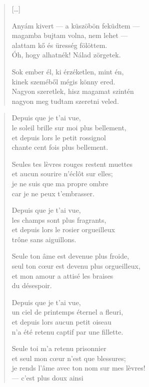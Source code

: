 \documentclass[11pt]{book}
\newcommand*{\centeredornament}{\centerline{\pgfornament[width=6cm]{88}}}
\begin{document}
\newpage

\vspace*{-15mm}
\centeredornament


\poemtitle*{\phantom{Gyermekké tettél}}

\begin{verse}
  \textnormal{[\ldots]}

  Anyám kivert --- a küszöbön feküdtem --- \\
  magamba bujtam volna, nem lehet --- \\
  alattam kő és üresség fölöttem. \\
  Óh, hogy alhatnék! Nálad zörgetek.

  Sok ember él, ki érzéketlen, mint én, \\
  kinek szeméből mégis könny ered. \\
  Nagyon szeretlek, hisz magamat szintén \\
  nagyon meg tudtam szeretni veled.
\end{verse}

\newpage

\vspace*{-15mm}
\centeredornament



\begin{verse}
  Depuis que je t'ai vue, \\
  le soleil brille sur moi plus bellement, \\
  et depuis lors le petit rossignol \\
  chante cent fois plus bellement.

  Seules tes lèvres rouges restent muettes \\
  et aucun sourire n'éclôt sur elles; \\
  je ne suis que ma propre ombre \\
  car je ne peux t'embrasser.

  Depuis que je t'ai vue, \\
  les champs sont plus fragrants, \\
  et depuis lors le rosier orgueilleux \\
  trône sans aiguillons.

  Seule ton âme est devenue plus froide, \\
  seul ton cœur est devenu plus orgueilleux, \\
  et mon amour a attisé les braises \\
  du désespoir.

  Depuis que je t'ai vue, \\
  un ciel de printemps éternel a fleuri, \\
  et depuis lors aucun petit oiseau \\
  n'a été retenu captif par une fillette.

  Seule toi m'a retenu prisonnier \\
  et seul mon cœur n'est que blessures; \\
  je rends l'âme avec ton nom sur mes lèvres! \\
  --- c'est plus doux ainsi
\end{verse}
\end{document}
